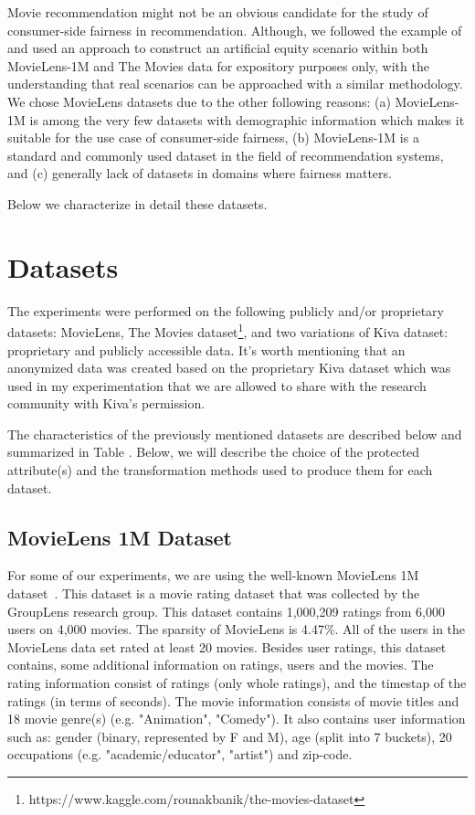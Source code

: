     Movie recommendation might not be an obvious candidate for the study of consumer-side fairness in recommendation. Although, we followed the example of \cite{yao2017beyond} and used an approach to construct an artificial equity scenario within both MovieLens-1M and The Movies data for expository purposes only, with the understanding that real scenarios can be approached with a similar methodology. We chose MovieLens datasets due to the other following reasons: (a) MovieLens-1M is among the very few datasets with demographic information which makes it suitable for the use case of consumer-side fairness, (b) MovieLens-1M is a standard and commonly used dataset in the field of recommendation systems, and (c) generally lack of datasets in domains where fairness matters.

    Below we characterize in detail these datasets.
    
\section{Datasets}

The experiments were performed on the following publicly and/or proprietary datasets: MovieLens\cite{movielens}, The Movies dataset\footnote{https://www.kaggle.com/rounakbanik/the-movies-dataset}, and two variations of Kiva dataset: proprietary and publicly accessible data.
It's worth mentioning that an anonymized data was created based on the proprietary Kiva dataset which was used in my experimentation that we are allowed to share with the research community with Kiva's permission.



The characteristics of the previously mentioned datasets are described below and summarized in Table . Below, we will describe the choice of the protected attribute(s) and the transformation methods used to produce them for each dataset.

    \subsection{MovieLens 1M Dataset}
    For some of our experiments, we are using the well-known MovieLens 1M dataset~\cite{movielens}. This dataset is a movie rating dataset that was collected by the GroupLens research group. This dataset contains 1,000,209 ratings from 6,000 users on 4,000 movies. The sparsity of MovieLens is 4.47\%. All of the users in the MovieLens data set rated at least 20 movies.
    Besides user ratings, this dataset contains, some additional information on ratings, users and the movies. The rating information consist of ratings (only whole ratings), and the timestap of the ratings (in terms of seconds). The movie information consists of movie titles and 18 movie genre(s) (e.g. "Animation", "Comedy"). It also contains user information such as: gender (binary, represented by F and M), age (split into 7 buckets), 20 occupations (e.g. "academic/educator", "artist") and zip-code.
    
